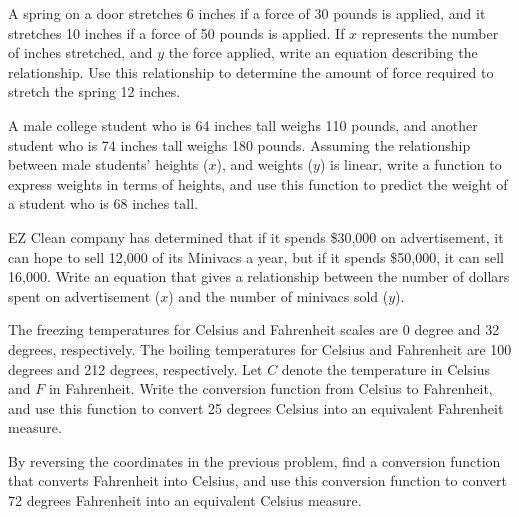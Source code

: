 \begin{puzzle}
    \item A spring on a door stretches 6 inches if a force of 30 pounds is applied, and it stretches 10 inches if a force of 50 pounds is applied. If \( x \) represents the number of inches stretched, and \( y \) the force applied, write an equation describing the relationship. Use this relationship to determine the amount of force required to stretch the spring 12 inches.
\end{puzzle}

\begin{puzzle}
    \item A male college student who is 64 inches tall weighs 110 pounds, and another student who is 74 inches tall weighs 180 pounds. Assuming the relationship between male students' heights (\( x \)), and weights (\( y \)) is linear, write a function to express weights in terms of heights, and use this function to predict the weight of a student who is 68 inches tall.
\end{puzzle}

\begin{puzzle}
    \item EZ Clean company has determined that if it spends \$30,000 on advertisement, it can hope to sell 12,000 of its Minivacs a year, but if it spends \$50,000, it can sell 16,000. Write an equation that gives a relationship between the number of dollars spent on advertisement (\( x \)) and the number of minivacs sold (\( y \)).
\end{puzzle}

\begin{puzzle}
    \item The freezing temperatures for Celsius and Fahrenheit scales are 0 degree and 32 degrees, respectively. The boiling temperatures for Celsius and Fahrenheit are 100 degrees and 212 degrees, respectively. Let \( C \) denote the temperature in Celsius and \( F \) in Fahrenheit. Write the conversion function from Celsius to Fahrenheit, and use this function to convert 25 degrees Celsius into an equivalent Fahrenheit measure.
\end{puzzle}

\begin{puzzle}
    \item By reversing the coordinates in the previous problem, find a conversion function that converts Fahrenheit into Celsius, and use this conversion function to convert 72 degrees Fahrenheit into an equivalent Celsius measure.
\end{puzzle}


